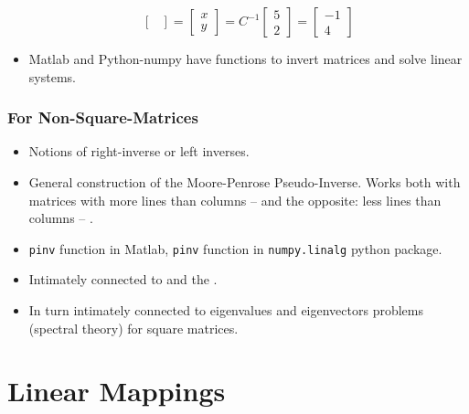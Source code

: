 \documentclass[8pt]{beamer}
\newcommand{\myemph}[1]{{\color{blue}{#1}}}
\begin{document}
\begin{frame}
\begin{itemize}
$$\begin{bmatrix}
    \end{bmatrix}
    =
    \begin{bmatrix}
      x \\ y
    \end{bmatrix}
    =
    C^{-1}
    \begin{bmatrix}
      5\\2
    \end{bmatrix} =
    \begin{bmatrix}
      -1\\4
    \end{bmatrix}
    $$
  \item Matlab and Python-numpy have functions to invert matrices and solve linear systems.
  \end{itemize}
\end{frame}


\begin{frame}
  \frametitle{For Non-Square-Matrices}
  \begin{itemize}
  \item Notions of right-inverse or left inverses.
  \item General construction of the Moore-Penrose
    Pseudo-Inverse. Works both with matrices with more lines than
    columns -- \myemph{overdetermined linear systems} and the
    opposite: less lines than columns -- \myemph{underdetermined
      linear systems}.
  \item \texttt{pinv} function in Matlab, \texttt{pinv} function in \texttt{numpy.linalg} python package.
  \item Intimately connected to \myemph{linear least-squares problems} and the \myemph{Singular Value Decomposition}.
  \item In turn intimately connected to eigenvalues and eigenvectors problems (spectral theory) for square matrices.
  \end{itemize}
\end{frame}

\section{Linear Mappings}
\end{document}
